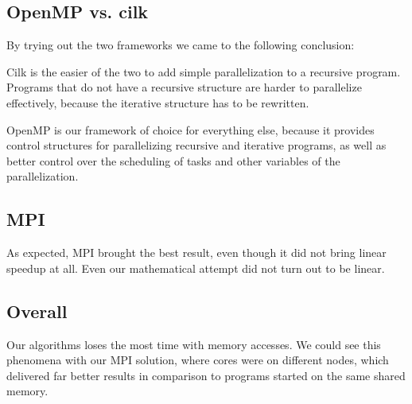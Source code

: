 \subsection{OpenMP vs. cilk}
By trying out the two frameworks we came to the following conclusion:

Cilk is the easier of the two to add simple parallelization to a recursive program. Programs that do not have a recursive structure are harder to parallelize effectively, because the iterative structure has to be rewritten. 

OpenMP is our framework of choice for everything else, because it provides control structures for parallelizing recursive and iterative programs, as well as better control over the scheduling of tasks and other variables of the parallelization.
\subsection{MPI}
As expected, MPI brought the best result, even though it did not bring linear speedup at all. Even our mathematical attempt did not turn out to be linear.

\subsection{Overall}
Our algorithms loses the most time with memory accesses. We could see this phenomena with our MPI solution, where cores were on different nodes, which delivered far better results in comparison to programs started on the same shared memory.  